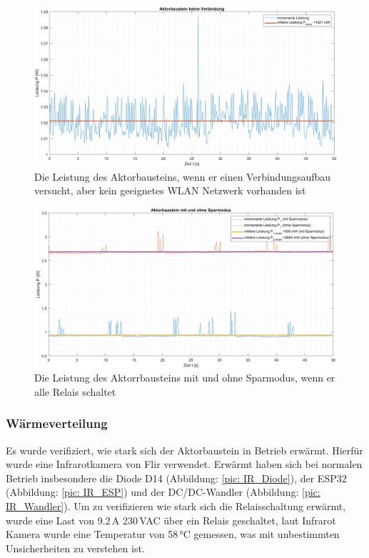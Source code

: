 \begin{figure}[H]
	\centering
	\includegraphics[width=1\textwidth]{graphics/Aktorbaustein_keine_Verbindung.png}
	\caption{Die Leistung des Aktorbausteins, wenn er einen Verbindungsaufbau versucht, aber kein geeignetes WLAN Netzwerk vorhanden ist}
	\label{pic: Aktorbaustein_keine_Verbindung}
\end{figure}

\begin{figure}[H]
	\centering
	\includegraphics[width=1\textwidth]{graphics/Aktorbaustein_Sparmodus.png}
	\caption{Die Leistung des Aktorrbausteins mit und ohne Sparmodus, wenn er alle Relais schaltet}
	\label{pic: Aktorbaustein_Sparmodus}
\end{figure}

\subsubsection{Wärmeverteilung}
Es wurde verifiziert, wie stark sich der Aktorbaustein in Betrieb erwärmt. Hierfür wurde eine Infrarotkamera von Flir verwendet. Erwärmt haben sich bei normalen Betrieb insbesondere die Diode D14 (Abbildung: \ref{pic: IR_Diode}), der ESP32 (Abbildung: \ref{pic: IR_ESP}) und der DC/DC-Wandler (Abbildung: \ref{pic: IR_Wandler}). Um zu verifizieren wie stark sich die Relaisschaltung erwärmt, wurde eine Last von 9.2\,A 230\,VAC über ein Relais geschaltet, laut Infrarot Kamera wurde eine Temperatur von 58\,°C gemessen, was mit unbestimmten Unsicherheiten zu verstehen ist.


